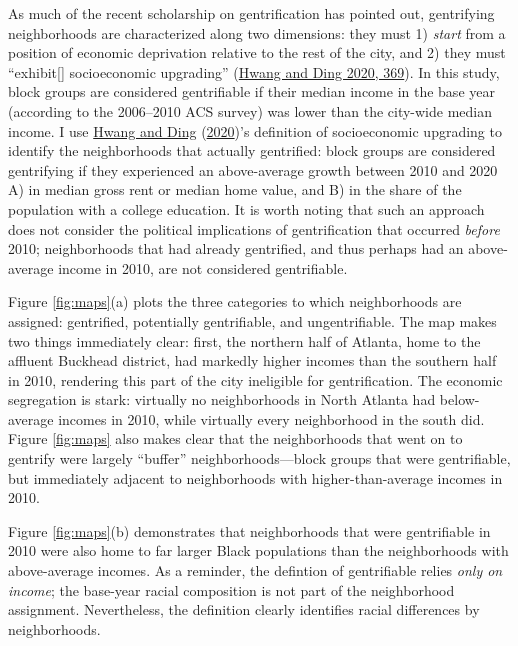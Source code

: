 \documentclass[
  12pt,
]{article}
\begin{document}
As much of the recent scholarship on gentrification has pointed out, gentrifying neighborhoods are characterized along two dimensions: they must 1) \emph{start} from a position of economic deprivation relative to the rest of the city, and 2) they must ``exhibit{[}{]} socioeconomic upgrading'' (\protect\hyperlink{ref-Hwang2020}{Hwang and Ding 2020, 369}). In this study, block groups are considered gentrifiable if their median income in the base year (according to the 2006--2010 ACS survey) was lower than the city-wide median income. I use \protect\hyperlink{ref-Hwang2020}{Hwang and Ding} (\protect\hyperlink{ref-Hwang2020}{2020})'s definition of socioeconomic upgrading to identify the neighborhoods that actually gentrified: block groups are considered gentrifying if they experienced an above-average growth between 2010 and 2020 A) in median gross rent or median home value, and B) in the share of the population with a college education. It is worth noting that such an approach does not consider the political implications of gentrification that occurred \emph{before} 2010; neighborhoods that had already gentrified, and thus perhaps had an above-average income in 2010, are not considered gentrifiable.

Figure \ref{fig:maps}(a) plots the three categories to which neighborhoods are assigned: gentrified, potentially gentrifiable, and ungentrifiable. The map makes two things immediately clear: first, the northern half of Atlanta, home to the affluent Buckhead district, had markedly higher incomes than the southern half in 2010, rendering this part of the city ineligible for gentrification. The economic segregation is stark: virtually no neighborhoods in North Atlanta had below-average incomes in 2010, while virtually every neighborhood in the south did. Figure \ref{fig:maps} also makes clear that the neighborhoods that went on to gentrify were largely ``buffer'' neighborhoods---block groups that were gentrifiable, but immediately adjacent to neighborhoods with higher-than-average incomes in 2010.

Figure \ref{fig:maps}(b) demonstrates that neighborhoods that were gentrifiable in 2010 were also home to far larger Black populations than the neighborhoods with above-average incomes. As a reminder, the defintion of gentrifiable relies \emph{only on income}; the base-year racial composition is not part of the neighborhood assignment. Nevertheless, the definition clearly identifies racial differences by neighborhoods.
\end{document}
